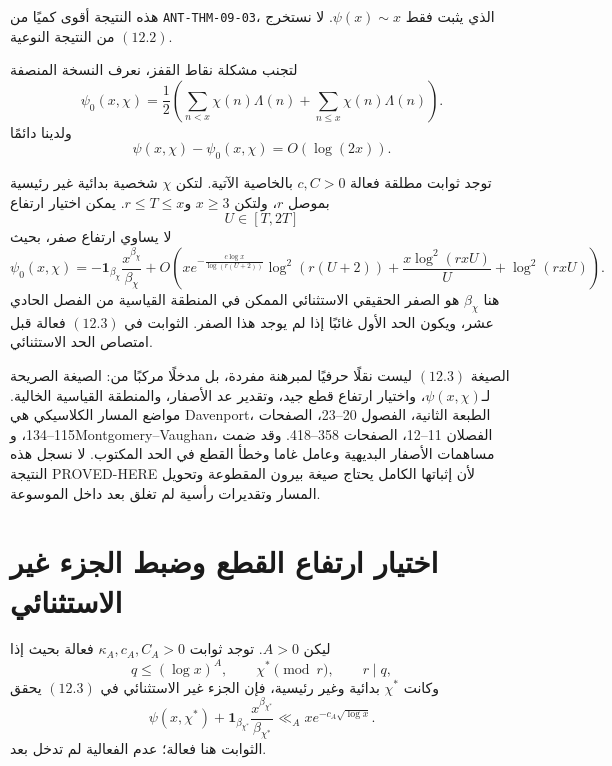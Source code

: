هذه النتيجة أقوى كميًا من \textenglish{\texttt{ANT-THM-09-03}}، الذي يثبت
فقط \(\psi(x)\sim x\). لا نستخرج \((12.2)\) من النتيجة النوعية.

لتجنب مشكلة نقاط القفز، نعرف النسخة المنصفة
\[
\psi_0(x,\chi)
=
\frac12\left(\sum_{n<x}\chi(n)\Lambda(n)+
              \sum_{n\le x}\chi(n)\Lambda(n)\right).
\]
ولدينا دائمًا
\[
\psi(x,\chi)-\psi_0(x,\chi)=O(\log(2x)).
\]

\begin{theorem}
\label{thm:chapter12-truncated-explicit-formula}
توجد ثوابت مطلقة فعالة \(c,C>0\) بالخاصية الآتية. لتكن \(\chi\) شخصية
بدائية غير رئيسية بموصل \(r\)، ولتكن \(x\ge3\) و\(r\le T\le x\). يمكن
اختيار ارتفاع
\[
U\in[T,2T]
\]
لا يساوي ارتفاع صفر، بحيث
\[
\psi_0(x,\chi)
=
-\mathbf 1_{\beta_\chi}
\frac{x^{\beta_\chi}}{\beta_\chi}
+O\!\left(
xe^{-\frac{c\log x}{\log(r(U+2))}}\log^2(r(U+2))
+
\frac{x\log^2(rxU)}{U}
+
\log^2(rxU)
\right).
\tag{12.3}
\]
هنا \(\beta_\chi\) هو الصفر الحقيقي الاستثنائي الممكن في المنطقة القياسية
من الفصل الحادي عشر، ويكون الحد الأول غائبًا إذا لم يوجد هذا الصفر.
الثوابت في \((12.3)\) فعالة قبل امتصاص الحد الاستثنائي.
\end{theorem}

الصيغة \((12.3)\) ليست نقلًا حرفيًا لمبرهنة مفردة، بل مدخلًا مركبًا من:
الصيغة الصريحة لـ\(\psi(x,\chi)\)، واختيار ارتفاع قطع جيد، وتقدير عد
الأصفار، والمنطقة القياسية الخالية. مواضع المسار الكلاسيكي هي Davenport،
الطبعة الثانية، الفصول 20--23، الصفحات 115--134، وMontgomery--Vaughan،
الفصلان 11--12، الصفحات 358--418. وقد ضمت مساهمات الأصفار البديهية وعامل
غاما وخطأ القطع في الحد المكتوب. لا نسجل هذه النتيجة
\textenglish{PROVED-HERE} لأن إثباتها الكامل يحتاج صيغة بيرون المقطوعة
وتحويل المسار وتقديرات رأسية لم تغلق بعد داخل الموسوعة.

\section{اختيار ارتفاع القطع وضبط الجزء غير الاستثنائي}

\begin{lemma}
\label{lem:chapter12-nonexceptional-zero-bound}
\provedhere
ليكن \(A>0\). توجد ثوابت \(\kappa_A,c_A,C_A>0\) فعالة بحيث إذا
\[
q\le(\log x)^A,
\qquad
\chi^*\pmod r,
\qquad
r\mid q,
\]
وكانت \(\chi^*\) بدائية وغير رئيسية، فإن الجزء غير الاستثنائي في
\((12.3)\) يحقق
\[
\psi(x,\chi^*)
+
\mathbf 1_{\beta_{\chi^*}}
\frac{x^{\beta_{\chi^*}}}{\beta_{\chi^*}}
\ll_A
xe^{-c_A\sqrt{\log x}}.
\tag{12.4}
\]
الثوابت هنا فعالة؛ عدم الفعالية لم تدخل بعد.
\end{lemma}

